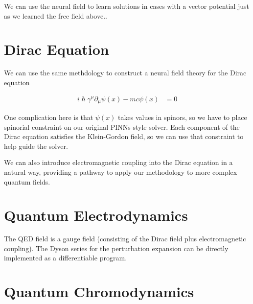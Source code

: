 \documentclass[book.tex]{subfiles}
\begin{document}
We can use the neural field to learn solutions in cases with a vector potential just as we learned the free field above.. %


\section{Dirac Equation}

We can use the same methdology to construct a neural field theory for the Dirac equation

\begin{align}
i \hslash \gamma^\mu \partial_\mu \psi(x) - m c\psi(x) &= 0
\end{align}

One complication here is that $\psi(x)$ takes values in spinors, so we have to place spinorial constraint on our original PINNs-style solver. Each component of the Dirac equation satisfies the Klein-Gordon field, so we can use that constraint to help guide the solver.

We can also introduce electromagnetic coupling into the Dirac equation in a natural way, providing a pathway to apply our methodology to more complex quantum fields.




\section{Quantum Electrodynamics}

The QED field is a gauge field (consisting of the Dirac field plus electromagnetic coupling). The Dyson series for the perturbation expansion can be directly implemented as a differentiable program.


\section{Quantum Chromodynamics}
\end{document}
